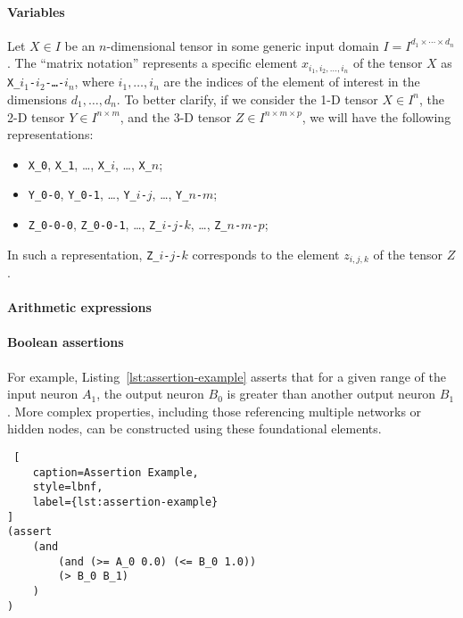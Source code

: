 \paragraph{Variables}
Let $X \in I$ be an $n$-dimensional tensor in some generic input domain $I = I^{d_1 \times \cdots \times d_n}$. The ``matrix notation'' represents a specific 
element $x_{i_1, i_2, \dots, i_n}$ of the tensor $X$ as \texttt{X\_$i_1$-$i_2$-\dots-$i_n$}, where $i_1, \dots, i_n$ are the indices of the element of interest in the 
dimensions $d_1, \dots, d_n$. To better clarify, if we consider the 1-D tensor $X \in I^n$, the 2-D tensor $Y \in I^{n \times m}$, and the 3-D tensor 
$Z \in I^{n \times m \times p}$, we will have the following representations:
\begin{itemize}
    \item \texttt{X\_0}, \texttt{X\_1}, \dots, \texttt{X\_$i$}, \dots, \texttt{X\_$n$};
    \item \texttt{Y\_0-0}, \texttt{Y\_0-1}, \dots, \texttt{Y\_$i$-$j$}, \dots, \texttt{Y\_$n$-$m$};
    \item \texttt{Z\_0-0-0}, \texttt{Z\_0-0-1}, \dots, \texttt{Z\_$i$-$j$-$k$}, \dots, \texttt{Z\_$n$-$m$-$p$};
\end{itemize}
In such a representation, \texttt{Z\_$i$-$j$-$k$} corresponds to the element $z_{i,j,k}$ of the tensor $Z$. 

\paragraph{Arithmetic expressions}

\paragraph{Boolean assertions}

For example, Listing~\ref{lst:assertion-example} asserts that for a given range of the input neuron $A_1$, the output neuron $B_0$ 
is greater than another output neuron $B_1$. More complex properties, including those referencing multiple networks or hidden nodes, 
can be constructed using these foundational elements.

\begin{lstlisting} [
	caption=Assertion Example, 
	style=lbnf,
    label={lst:assertion-example}
]
(assert 
    (and 
        (and (>= A_0 0.0) (<= B_0 1.0)) 
        (> B_0 B_1)
    )
)
\end{lstlisting}

